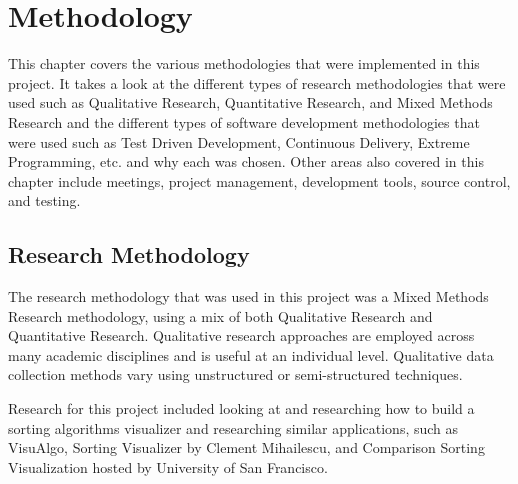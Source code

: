 \chapter{Methodology}
This chapter covers the various methodologies that were implemented in this 
project. It takes a look at the different types of research methodologies that 
were used such as Qualitative Research, Quantitative Research, and Mixed Methods
Research and the different types of software development methodologies that were
used such as Test Driven Development, Continuous Delivery, Extreme Programming, 
etc. and why each was chosen. Other areas also covered in this chapter include
meetings, project management, development tools, source control, and testing.

\section{Research Methodology}
The research methodology that was used in this project was a Mixed Methods 
Research methodology, using a mix of both Qualitative Research and Quantitative 
Research. Qualitative research approaches are employed across many academic 
disciplines and is useful at an individual level. Qualitative data collection
methods vary using unstructured or semi-structured techniques.
\par
\medskip
Research for this project included looking at and researching how to build a sorting algorithms visualizer \cite{sortal_build} and researching similar applications, such as VisuAlgo, Sorting Visualizer by Clement Mihailescu, and Comparison Sorting Visualization hosted by University of San Francisco. 

\newpage
